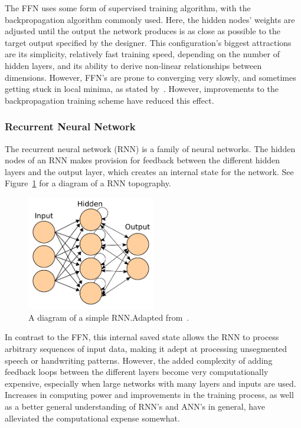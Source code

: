 The FFN uses some form of supervised training algorithm, with the backpropagation algorithm commonly used. Here, the hidden nodes' weights are adjusted until the output the network produces is as close as possible to the target output specified by the designer. This configuration's biggest attractions are its simplicity, relatively fast training speed, depending on the number of hidden layers, and its ability to derive non-linear relationships between dimensions. However, FFN's are prone to converging very slowly, and sometimes getting stuck in local minima, as stated by~\cite{svozil1997introduction}. However, improvements to the backpropagation training scheme have reduced this effect.

\subsubsection{Recurrent Neural Network}

The recurrent neural network (RNN) is a family of neural networks. The hidden nodes of an RNN makes provision for feedback between the different hidden layers and the output layer, which creates an internal state for the network. See Figure~\ref{fig:chap2-rnn-diagram} for a diagram of a RNN topography.

\begin{figure}
 \centering
 \includegraphics[width=0.5\textwidth]{figures/chapter2/rnn_diagram}
 \caption[A diagram of a simple RNN.]{A diagram of a simple RNN.\@ Adapted from~\cite{ann-wiki-pic}.}
\label{fig:chap2-rnn-diagram}
\end{figure}

In contrast to the FFN, this internal saved state allows the RNN to process arbitrary sequences of input data, making it adept at processing unsegmented speech or handwriting patterns. However, the added complexity of adding feedback loops between the different layers become very computationally expensive, especially when large networks with many layers and inputs are used. Increases in computing power and improvements in the training process, as well as a better general understanding of RNN's and ANN's in general, have alleviated the computational expense somewhat.

